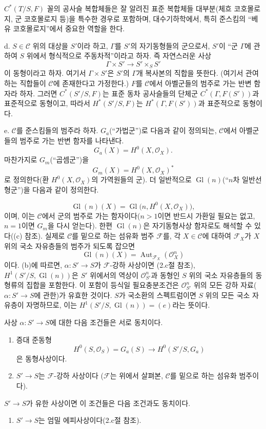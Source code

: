  $C^*(T/S,F)$ 꼴의 공사슬 복합체들은 잘 알려진 표준
복합체들 대부분(체흐 코호몰로지, 군 코호몰로지 등)을 특수한 경우로
포함하며, 대수기하학에서, 특히 준스킴의 ``베유 코호몰로지''에서 중요한
역할을 한다.

\medskip\noindent
d.  $S\in\mathcal C$ 위의 대상을 $S'$이라 하고,
$\Gamma$를 $S'$의 자기동형들의 군으로서, $S'$이 ``군 $\Gamma$에 관하여
$S$ 위에서 형식적으로 주동차적''이라고 하자. 즉 자연스러운 사상
\[
  \Gamma\times S'\longrightarrow S'\times_SS'
\]
이 동형이라고 하자. 여기서 $\Gamma\times S'$은 $S'$의 $\Gamma$개
복사본의 직합을 뜻한다. (여기서 관여하는 직합들이 $\mathcal C$에
존재한다고 가정한다.) $F$를 $\mathcal C$에서 아벨군들의 범주로 가는
반변 함자라 하자. 그러면 $C^*(S'/S,F)$는 표준 동차 공사슬들의 단체군
$C^*(\Gamma,F(S'))$과 표준적으로 동형이고, 따라서 $H^*(S'/S,F)$는
$H^*(\Gamma,F(S'))$과 표준적으로 동형이다.

\medskip\noindent
e.  $\mathcal C$를 준스킴들의 범주라 하자. $G_a$(``가법군'')로
다음과 같이 정의되는, $\mathcal C$에서 아벨군들의 범주로 가는 반변 함자를
나타낸다.
\[
  G_a(X)=H^0(X,\mathcal O_X).
\]
마찬가지로 $G_m$(``곱셈군'')을
\[
  G_m(X)=H^0(X,\mathcal O_X)^*
\]
로 정의한다(환 $H^0(X,\mathcal O_X)$의 가역원들의 군). 더 일반적으로
$\operatorname{Gl}(n)$(``$n$차 일반선형군'')을 다음과 같이 정의한다.

\[
  \operatorname{Gl}(n)(X)=
  \operatorname{Gl}\bigl(n,H^0(X,\mathcal O_X)\bigr),
\]
이며, 이는 $\mathcal C$에서 군의 범주로 가는 함자이다($n>1$이면
반드시 가환일 필요는 없고, $n=1$이면 $G_m$을 다시 얻는다). 한편
$\operatorname{Gl}(n)$은 자기동형사상 함자로도 해석할 수 있다((c) 참조).
실제로 $\mathcal C$를 밑으로 하는 섬유화 범주 $\mathcal F$를, 각
$X\in\mathcal C$에 대하여 $\mathcal F_X$가 $X$ 위의 국소 자유층들의
범주가 되도록 잡으면
\[
  \operatorname{Gl}(n)(X)=
  \operatorname{Aut}_{\mathcal F_X}(\mathcal O_X^n)
\]
이다.
(b)에 따르면, $\alpha:S'\longrightarrow S$가 $\mathcal F$-강하 사상이면
(2.c절 참조), $H^1(S'/S,\operatorname{Gl}(n))$은 $S'$ 위에서의 역상이
$\mathcal O_{S'}^n$과 동형인 $S$ 위의 국소 자유층들의 동형류의 집합을
포함한다. 이 포함이 등식일 필요충분조건은
$\mathcal O_{S'}^n$ 위의 모든 강하 자료($\alpha:S'\longrightarrow S$에
관한)가 유효한 것이다. $S$가 국소환의 스펙트럼이면 $S$ 위의 모든
국소 자유층이 자명하므로, 이는
$H^1(S'/S,\operatorname{Gl}(n))=(e)$라는 뜻이다.

사상 $\alpha:S'\longrightarrow S$에 대한 다음 조건들은 서로 동치이다.
\begin{enumerate}
\item[(i)] 증대 준동형
\[
  H^0(S,\mathcal O_S)=G_a(S)\longrightarrow H^0(S'/S,G_a)
\]
은 동형사상이다.
\item[(ii)] $S'\longrightarrow S$는 $\mathcal F$-강하 사상이다
($\mathcal F$는 위에서 살펴본, $\mathcal C$를 밑으로 하는 섬유화
범주이다).
\end{enumerate}
$S'\longrightarrow S$가 유한 사상이면 이 조건들은 다음 조건과도
동치이다.
\begin{enumerate}
\item[(iii)] $S'\longrightarrow S$는 엄밀 에피사상이다(2.c절 참조).
\end{enumerate}


